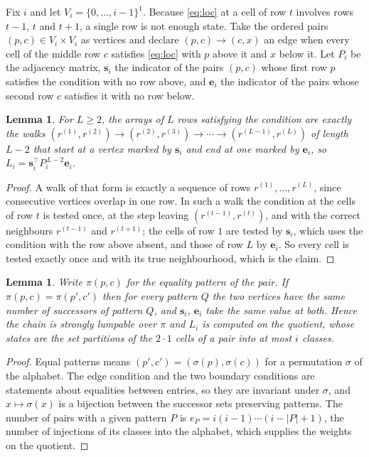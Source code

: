\documentclass[11pt,a4paper]{article}
\theoremstyle{plain}
\newtheorem{lemma}[theorem]{Lemma}
\theoremstyle{definition}
\begin{document}
Fix $i$ and let $V_i=\{0,\dots,i-1\}^{1}$. Because \eqref{eq:loc} at a cell of row
$t$ involves rows $t-1$, $t$ and $t+1$, a single row is not enough state. Take the
ordered pairs $(p,c)\in V_i\times V_i$ as vertices and declare $(p,c)\to(c,x)$ an edge when
every cell of the middle row $c$ satisfies \eqref{eq:loc} with $p$ above it and $x$
below it. Let $P_i$ be the adjacency matrix, $\mathbf{s}_i$ the indicator of the pairs
$(p,c)$ whose first row $p$ satisfies the condition with no row above, and
$\mathbf{e}_i$ the indicator of the pairs whose second row $c$ satisfies it with no
row below.

\begin{lemma}\label{lem:walk}
For $L\ge2$, the arrays of $L$ rows satisfying the condition are exactly the walks
$(r^{(1)},r^{(2)})\to(r^{(2)},r^{(3)})\to\cdots\to(r^{(L-1)},r^{(L)})$ of length
$L-2$ that start at a vertex marked by $\mathbf{s}_i$ and end at one marked by
$\mathbf{e}_i$, so
$L_i=\mathbf{s}_i^{\!\top}P_i^{\,L-2}\mathbf{e}_i$.
\end{lemma}

\begin{proof}
A walk of that form is exactly a sequence of rows $r^{(1)},\dots,r^{(L)}$, since
consecutive vertices overlap in one row. In such a walk the condition at the cells of
row $t$ is tested once, at the step leaving $(r^{(t-1)},r^{(t)})$, and with the
correct neighbours $r^{(t-1)}$ and $r^{(t+1)}$; the cells of row $1$ are tested by
$\mathbf{s}_i$, which uses the condition with the row above absent, and those of row
$L$ by $\mathbf{e}_i$. So every cell is tested exactly once and with its true
neighbourhood, which is the claim.
\end{proof}

\begin{lemma}\label{lem:lump}
Write $\pi(p,c)$ for the equality pattern of the pair. If $\pi(p,c)=\pi(p',c')$ then for
every pattern $Q$ the two vertices have the same number of successors of pattern $Q$, and
$\mathbf{s}_i$, $\mathbf{e}_i$ take the same value at both. Hence the chain is strongly
lumpable over $\pi$ and $L_i$ is computed on the quotient, whose states are the set
partitions of the $2\cdot1$ cells of a pair into at most $i$ classes.
\end{lemma}

\begin{proof}
Equal patterns means $(p',c')=(\sigma(p),\sigma(c))$ for a permutation $\sigma$ of the
alphabet. The edge condition and the two boundary conditions are statements about equalities
between entries, so they are invariant under $\sigma$, and $x\mapsto\sigma(x)$ is a bijection
between the successor sets preserving patterns. The number of pairs with a given pattern $P$
is $e_P=i(i-1)\cdots(i-|P|+1)$, the number of injections of its classes into the alphabet,
which supplies the weights on the quotient.
\end{proof}
\end{document}

